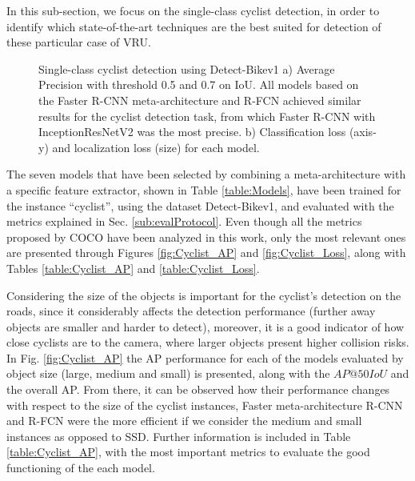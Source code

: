 \documentclass[journal]{IEEEtran}
\begin{document}
In this sub-section, we focus on the single-class cyclist detection, in order to identify which state-of-the-art techniques are the best suited for detection of these particular case of VRU.

\begin{figure}[t]
\begin{center}
    \newline
    \vspace{-0.3cm}
 \caption{Single-class cyclist detection using Detect-Bikev1 a) Average Precision with threshold 0.5 and 0.7 on IoU. All models based on the Faster R-CNN meta-architecture and R-FCN achieved similar results for the cyclist detection task, from which Faster R-CNN with InceptionResNetV2 was the most precise.  b) Classification loss (axis-y) and localization loss (size) for each model. 
\label{fig:Cyclist_Results}}
\end{center}
\end{figure}

The seven models that have been selected by combining a meta-architecture with a specific feature extractor, shown in Table \ref{table:Models}, have been trained for the instance ``cyclist'', using the dataset Detect-Bikev1, and evaluated with the metrics explained in Sec. \ref{sub:evalProtocol}. Even though all the metrics proposed by COCO \cite{lin2014microsoft} have been analyzed in this work, only the most relevant ones are presented through Figures \ref{fig:Cyclist_AP} and  \ref{fig:Cyclist_Loss}, along with Tables \ref{table:Cyclist_AP} and \ref{table:Cyclist_Loss}.

Considering the size of the objects is important for the cyclist's detection on the roads, since it considerably affects the detection performance (further away objects are smaller and harder to detect), moreover, it is a good indicator of how close cyclists are to the camera, where larger objects present  higher collision risks. In Fig. \ref{fig:Cyclist_AP} the AP performance for each of the models evaluated by object size (large, medium and small) is presented, along with the $AP@50IoU$ and the overall AP. From there, it can be observed how their performance changes with respect to the size of the cyclist instances, Faster meta-architecture R-CNN and R-FCN were the more efficient if we consider the medium and small instances as opposed to SSD. Further information is included in Table  \ref{table:Cyclist_AP}, with the most important metrics to evaluate the good functioning of the each model. 
\end{document}
